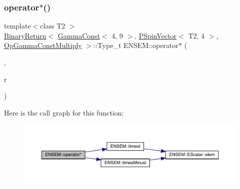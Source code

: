 \mbox{\label{group__primspinvector_ga61476a03c8d043d2e32e6ba22ec70bb5}} 
\subsubsection{\texorpdfstring{operator$\ast$()}{operator*()}\hspace{0.1cm}{\footnotesize\ttfamily [10/32]}}
{\footnotesize\ttfamily template$<$class T2 $>$ \\
\mbox{\hyperlink{structENSEM_1_1BinaryReturn}{Binary\+Return}}$<$ \mbox{\hyperlink{classENSEM_1_1GammaConst}{Gamma\+Const}}$<$ 4, 9 $>$, \mbox{\hyperlink{classENSEM_1_1PSpinVector}{P\+Spin\+Vector}}$<$ T2, 4 $>$, \mbox{\hyperlink{structENSEM_1_1OpGammaConstMultiply}{Op\+Gamma\+Const\+Multiply}} $>$\+::Type\+\_\+t E\+N\+S\+E\+M\+::operator$\ast$ (\begin{DoxyParamCaption}\item[{const \mbox{\hyperlink{classENSEM_1_1GammaConst}{Gamma\+Const}}$<$ 4, 9 $>$ \&}]{,  }\item[{const \mbox{\hyperlink{classENSEM_1_1PSpinVector}{P\+Spin\+Vector}}$<$ T2, 4 $>$ \&}]{r }\end{DoxyParamCaption})\hspace{0.3cm}{\ttfamily [inline]}}

Here is the call graph for this function\+:\nopagebreak
\begin{figure}[H]
\begin{center}
\leavevmode
\includegraphics[width=350pt]{dd/d6d/group__primspinvector_ga61476a03c8d043d2e32e6ba22ec70bb5_cgraph}
\end{center}
\end{figure}
\mbox{\label{group__primspinvector_gab079c599559400400256e044d153a9f0}} 
